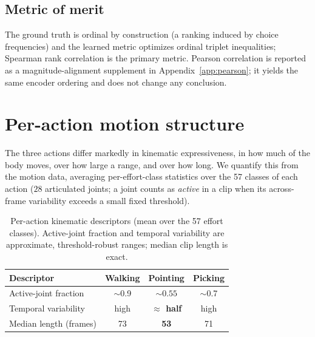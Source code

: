 \documentclass[letterpaper]{article} %
\begin{document}
\subsection{Metric of merit}
The ground truth is {ordinal} by construction (a ranking induced by choice frequencies)
and the learned metric optimizes ordinal triplet inequalities; {Spearman rank correlation
is the primary metric.} Pearson correlation is reported as a magnitude-alignment supplement in
Appendix~\ref{app:pearson}; it yields the same encoder ordering and does not change any conclusion.

\section{Per-action motion structure}
\label{sec:peraction}
The three actions differ markedly in {kinematic expressiveness}, in how much of the body
moves, over how large a range, and over how long. We quantify this from the motion data,
averaging per-effort-class statistics over the 57 classes of each action ($28$ articulated
joints; a joint counts as \emph{active} in a clip when its across-frame variability exceeds a
small fixed threshold).

\begin{table}[h]
\centering
\caption{Per-action kinematic descriptors (mean over the 57 effort classes). Active-joint
fraction and temporal variability are approximate, threshold-robust ranges; median clip length
is exact.}
\setlength{\tabcolsep}{4pt}
\small
\begin{tabular}{lccc}
\toprule
Descriptor & Walking & Pointing & Picking \\
\midrule
Active-joint fraction & $\sim$0.9 & $\mathbf{\sim 0.55}$ & $\sim$0.7 \\
Temporal variability & high & \textbf{$\approx$ half} & high \\
Median length (frames) & 73 & \textbf{53} & 71 \\
\bottomrule
\end{tabular}
\end{table}
\end{document}
